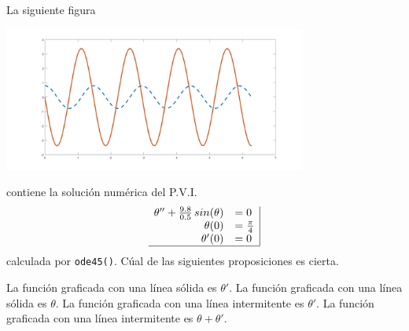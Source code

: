 \begin{pregunta}
\begin{cuerpo}
La siguiente figura 
\begin{center}
\includegraphics[width=0.75\textwidth]{./img/p14.jpg}
\end{center}
contiene la soluci\'on num\'erica del P.V.I.
$$\begin{array}{rl|}
\theta''+\frac{9.8}{0.5} \,sin(\theta)	&=0\\
\theta(0)	&=\frac{\pi}{4}\\
\theta'(0)	&=0\\ \hline
\end{array}$$
calculada por \texttt{ode45()}. C\'ual de las siguientes proposiciones es cierta.
\end{cuerpo}

\begin{multicols}{2}
\begin{alternativas}
{La funci\'on graficada con una l\'inea s\'olida es $\theta'$.}
{La funci\'on graficada con una l\'inea s\'olida es $\theta$.}
{La funci\'on graficada con una l\'inea intermitente es $\theta'$.}
{La funci\'on graficada con una l\'inea intermitente es $\theta+\theta'$.}
\end{alternativas}
\end{multicols}
\justificacion{0cm}
\end{pregunta}